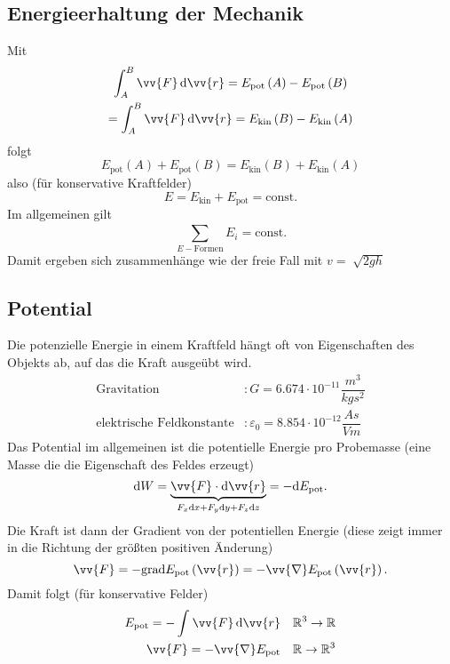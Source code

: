 \documentclass[a4paper,12pt]{article}
\newcommand{\td}{\,\text{d}}
\numberwithin{equation}{section}
\begin{document}
\subsection{Energieerhaltung der Mechanik}
Mit
\begin{gather*}
        \int_{A}^{B}\vv{F}\td\vv{r}=E_{\text{pot}}\left(A\right)-E_{\text{pot}}\left(B\right)\\
        =\int_{A}^{B}\vv{F}\td\vv{r}=E_{\text{kin}}\left(B\right)-E_{\text{kin}}\left(A\right)
\end{gather*}
folgt
\[ 
        E_{\text{pot}}\left(A\right)+E_{\text{pot}}\left(B\right)=E_{\text{kin}}\left(B\right)+E_{\text{kin}}\left(A\right)
\] 
also (für konservative Kraftfelder)
\[ 
        E=E_{\text{kin}}+E_{\text{pot}}=\text{const}
.\] 
Im allgemeinen gilt
\[ 
        \sum_{E-\text{Formen}}^{}E_i=\text{const}
.\] 
Damit ergeben sich zusammenhänge wie der freie Fall mit $v=\sqrt[]{2gh}$  

\subsection{Potential}
Die potenzielle Energie in einem Kraftfeld hängt oft von Eigenschaften des Objekts ab, auf das die Kraft ausgeübt wird.
\begin{align*}
        \text{Gravitation}&:G=6.674\cdot 10^{-11}\dfrac{m ^{3}}{kgs ^2}\\
        \text{elektrische Feldkonstante}&:\varepsilon _0=8.854\cdot 10^{-12}\dfrac{As}{Vm}
\end{align*}
Das Potential im allgemeinen ist die potentielle Energie pro Probemasse (eine Masse die die Eigenschaft des Feldes erzeugt)
\[ 
        \text{d}W=\underbrace{\vv{F}\cdot \text{d}\vv{r}}_{F_x\text{d}x+F_y\text{d}y+F_z\text{d}z}=-\text{d}E_{\text{pot}}
.\] 
Die Kraft ist dann der Gradient von der potentiellen Energie (diese zeigt immer in die Richtung der größten positiven Änderung)
\[ 
        \vv{F}=-\text{grad}E_{\text{pot}}\left(\vv{r}\right)=-\vv{\nabla}E_{\text{pot}}\left(\vv{r}\right)
.\] 
Damit folgt (für konservative Felder)
\begin{align*}
        E_{\text{pot}}=-\int_{}^{}\vv{F}\td\vv{r}&&\mathbb{R}^{3}\rightarrow \mathbb{R}\\
        \vv{F}=-\vv{\nabla}E_{\text{pot}}&&\mathbb{R}\rightarrow \mathbb{R}^{3}\\
\end{align*}
\end{document}
